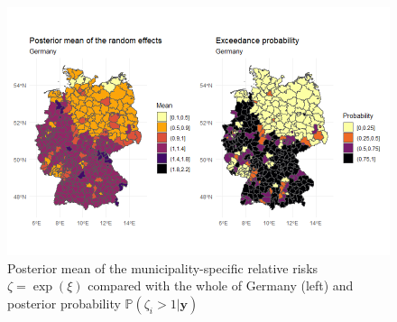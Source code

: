 \begin{figure}[H]
  \centering
  \includegraphics[width = \textwidth]{posterior_germany.png}
  \caption{Posterior mean of the municipality-specific relative risks $\zeta=\exp{\left(\xi\right)}$ compared with the whole of Germany (left) and posterior probability $\mathbb{P}\left(\zeta_i>1|\pmb{y}\right)$}
  \label{posterior_germany}
\end{figure}
